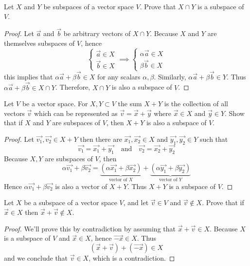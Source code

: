 \documentclass{article}
\begin{document}
\begin{exercise}
  Let $X$ and $Y$ be subspaces of a vector space $V$. Prove that
  $X\cap Y$ is a subspace of $V$.
\end{exercise}
\begin{proof}
  Let $\vec{a}$ and $\vec{b}$ be arbitrary vectors of $X\cap Y$.
  Because $X$ and $Y$ are themselves  subspaces of $V$, hence 
  \[
    \begin{cases}
      \vec{a}\in X\\
      \vec{b}\in X
    \end{cases}\implies
    \begin{cases}
      \alpha\vec{a}\in X\\
      \beta\vec{b}\in X
    \end{cases}
  \]
  this implies that $\alpha\vec{a}+\beta\vec{b}\in X$ for
  any scalars $\alpha,\beta$. Similarly, $\alpha\vec{a}+\beta\vec{b}\in Y$.
  Thus $\alpha\vec{a}+\beta\vec{b}\in X\cap Y$. Therefore, 
  $X\cap Y$ is also a subspace of $V$.
\end{proof}
\begin{exercise}
  Let $V$ be a vector space. For $X,Y\subset V$ the sum $X+Y$
  is the collection of all vectors $\vec{v}$ which can be represented as 
  $\vec{v}=\vec{x}+\vec{y}$ where $\vec{x}\in X$ and $\vec{y}\in Y$.
  Show that if $X$ and $Y$ are subspaces of $V$, then $X+Y$ is also
  a subspace of $V$.
\end{exercise}
\begin{proof}
  Let $\vec{v_1},\vec{v_2}\in X+Y$ then there are $\vec{x_1},\vec{x_2}\in X$
  and $\vec{y_1},\vec{y_2}\in Y$ such that
  \[
    \vec{v_1}=\vec{x_1}+\vec{y_1}
    \quad\text{and}\quad
    \vec{v_2}=\vec{x_2}+\vec{y_2}
  \]
  Because $X,Y$ are subspaces of $V$, then
  \[
    \alpha\vec{v_1}+\beta\vec{v_2}
    =\underbrace{(\alpha\vec{x_1}+\beta\vec{x_2})}_{\text{vector of $X$}} + 
    \underbrace{(\alpha\vec{y_1}+\beta\vec{y_2})}_{\text{vector of $Y$}}
  \]
  Hence $\alpha\vec{v_1}+\beta\vec{v_2}$ is also a vector of $X+Y$.
  Thus $X+Y$ is a subspace of $V$.
\end{proof}
\begin{exercise}
  Let $X$ be a subspace of a vector space $V$, and let $\vec{v}\in V$
  and $\vec{v}\notin X$. Prove that if $\vec{x}\in X$ then
  $\vec{x}+\vec{v}\notin X$.
\end{exercise}
\begin{proof}
  We'll prove this by contradiction by assuming that 
  $\vec{x}+\vec{v}\in X$. Because $X$ is a subspace of $V$ and 
  $\vec{x}\in X$, hence $\vec{-x}\in X$. Thus
  \[
    (\vec{x}+\vec{v})+(\vec{-x})\in X
  \]
  and we conclude that $\vec{v}\in X$, which is a contradiction.
\end{proof}
\end{document}
